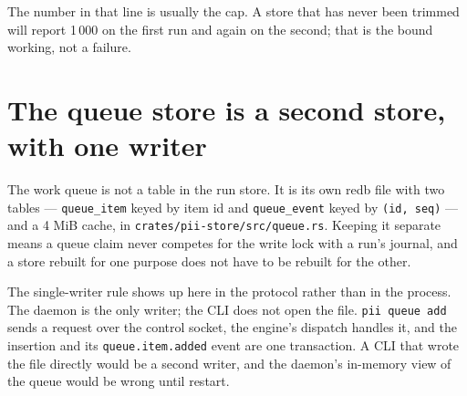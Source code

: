 The number in that line is usually the cap. A store that has never been trimmed will report
1\,000 on the first run and again on the second; that is the bound working, not a failure.

\begin{center}
\end{center}

\section{The queue store is a second store, with one writer}

The work queue is not a table in the run store. It is its own redb file with two tables ---
\texttt{queue\_item} keyed by item id and \texttt{queue\_event} keyed by \texttt{(id, seq)}
--- and a 4 MiB cache, in \texttt{crates/pii-store/src/queue.rs}. Keeping it separate means a
queue claim never competes for the write lock with a run's journal, and a store rebuilt for
one purpose does not have to be rebuilt for the other.

The single-writer rule shows up here in the protocol rather than in the process. The daemon is
the only writer; the CLI does not open the file. \texttt{pii queue add} sends a request over
the control socket, the engine's dispatch handles it, and the insertion and its
\texttt{queue.item.added} event are one transaction. A CLI that wrote the file directly would
be a second writer, and the daemon's in-memory view of the queue would be wrong until restart.

